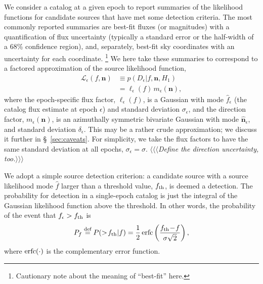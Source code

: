 \documentclass[twocolumn]{emulateapj}
\newcommand{\erfc}{{\rm{}erfc}}
\newcommand*{\defeq}{\stackrel{\text{def}}{=}}
\newcommand{\eind}{\epsilon}  %
\newcommand{\edata}{D_\eind}  %
\newcommand{\like}{\mathcal{L}}  %
\newcommand{\flike}{\ell}  %
\newcommand{\dlike}{m}  %
\newcommand{\flux}{f}
\newcommand{\fest}{\hat{\flux}}  %
\newcommand{\fsig}{\sigma}  %
\newcommand{\drxn}{\mathbf{n}}
\newcommand{\dest}{\hat{\mathbf{n}}}  %
\newcommand{\dsig}{\delta}  %
\newcommand{\dtxn}{\mathcal{D}}  %
\newcommand{\ndtxn}{\mathcal{N}}  %
\newcommand{\accept}{\mathcal{A}}  %
\newcommand{\fth}{\flux_{\rm th}}
\newcommand\enote[1]{ %
\marginpar[\raggedleft\large $\blacktriangleright$]%
{\raggedright\large $\blacktriangleleft$} %
{\large $\langle\langle\langle$}{\sl #1}{\large  $\rangle\rangle\rangle$} %
}
\begin{document}
We consider a catalog at a given epoch to report summaries of the likelihood functions for candidate sources that have met some detection criteria.
The most commonly reported summaries are best-fit fluxes (or magnitudes) with a quantification of flux uncertainty (typically a standard error or the half-width of a 68\% confidence region), and, separately, best-fit sky coordinates with an uncertainty for each coordinate.%
\footnote{Cautionary note about the meaning of ``best-fit'' here.}
We here take these summaries to correspond to a factored approximation of the source likelihood function,
\begin{align} \label{eq:eplike}
\like_\eind(\flux, \drxn)
  &\equiv p(\edata|\flux, \drxn, H_1)\nonumber\\
  &= \flike_\eind(\flux)\, \dlike_\eind(\drxn),
\end{align}
where the epoch-specific flux factor, $\flike_\eind(\flux)$, is a Gaussian with mode $\fest_\eind$ (the catalog flux estimate at epoch $\eind$) and standard deviation $\fsig_\eind$, and the direction factor, $\dlike_\eind(\drxn)$, is an azimuthally symmetric bivariate Gaussian with mode $\dest_\eind$, and standard deviation $\dsig_\eind$.
This may be a rather crude approximation; we discuss it further in \S~\ref{sec:caveats}.
For simplicity, we take the flux factors to have the same standard deviation at all epochs,  $\fsig_\eind = \sigma$.
\enote{Define the direction uncertainty, too.}




We adopt a simple source detection criterion: a candidate source with a source likelihood mode $\fest$ larger than a threshold value, $\fth$, is deemed a detection.
The probability for detection in a single-epoch catalog is just the integral of the Gaussian likelihood function above the threshold. 
In other words, the probability of the event that \mbox{$\flux_\eind>\fth$} is
%
\begin{equation}\label{eq:pf}
P_f \defeq P(>\!\fth|f) = \frac{1}{2}\,\erfc\left(\frac{\fth\!-\!f}{\sigma\sqrt{2}}\right),
\end{equation}
%
where $\erfc(\cdot)$ is the complementary error function.
 
\end{document}
